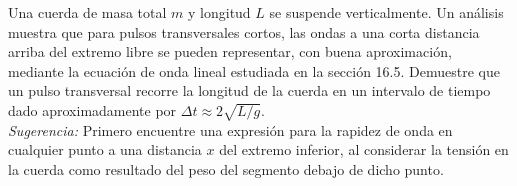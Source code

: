 \item Una cuerda de masa total $m$ y longitud $L$ se suspende verticalmente. Un análisis muestra que para pulsos transversales cortos, las ondas a una corta distancia arriba del extremo libre se pueden representar, con buena aproximación, mediante la ecuación de onda lineal estudiada en la sección 16.5. Demuestre que un pulso transversal recorre la longitud de la cuerda en un intervalo de tiempo dado aproximadamente por $\Delta t \approx 2 \sqrt{L/g}$. \\
\textit{Sugerencia:} Primero encuentre una expresión para la rapidez de onda en cualquier punto a una distancia $x$ del extremo inferior, al considerar la tensión en la cuerda como resultado del peso del segmento debajo de dicho punto.